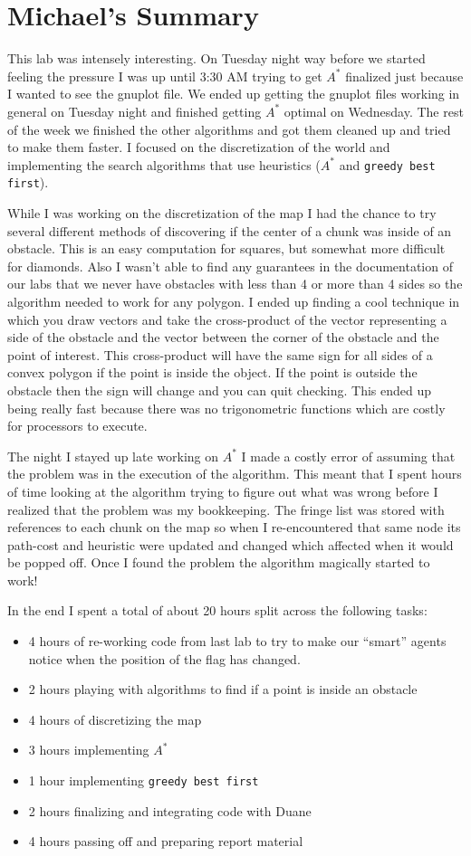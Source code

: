 \section{Michael's Summary}
This lab was intensely interesting.  On Tuesday night way before we started feeling the pressure I was up until 3:30 AM trying to get $A^*$ finalized just because I wanted to see the gnuplot file.  We ended up getting the gnuplot files working in general on Tuesday night and finished getting $A^*$ optimal on Wednesday.  The rest of the week we finished the other algorithms and got them cleaned up and tried to make them faster.  I focused on the discretization of the world and implementing the search algorithms that use heuristics ($A^*$ and \texttt{greedy best first}).
\par
While I was working on the discretization of the map I had the chance to try several different methods of discovering if the center of a chunk was inside of an obstacle.  This is an easy computation for squares, but somewhat more difficult for diamonds.  Also I wasn't able to find any guarantees in the documentation of our labs that we never have obstacles with less than 4 or more than 4 sides so the algorithm needed to work for any polygon.  I ended up finding a cool technique in which you draw vectors and take the cross-product of the vector representing a side of the obstacle and the vector between the corner of the obstacle and the point of interest.  This cross-product will have the same sign for all sides of a convex polygon if the point is inside the object.  If the point is outside the obstacle then the sign will change and you can quit checking.  This ended up being really fast because there was no trigonometric functions which are costly for processors to execute.
\par
The night I stayed up late working on $A^*$ I made a costly error of assuming that the problem was in the execution of the algorithm.  This meant that I spent hours of time looking at the algorithm trying to figure out what was wrong before I realized that the problem was my bookkeeping.  The fringe list was stored with references to each chunk on the map so when I re-encountered that same node its path-cost and heuristic were updated and changed which affected when it would be popped off.  Once I found the problem the algorithm magically started to work!
\par
In the end I spent a total of about 20 hours split across the following tasks:
\begin{itemize}
    \item 4 hours of re-working code from last lab to try to make our ``smart'' agents notice when the position of the flag has changed.
    \item 2 hours playing with algorithms to find if a point is inside an obstacle
    \item 4 hours of discretizing the map
    \item 3 hours implementing $A^*$
    \item 1 hour implementing \texttt{greedy best first}
    \item 2 hours finalizing and integrating code with Duane
    \item 4 hours passing off and preparing report material
\end{itemize}